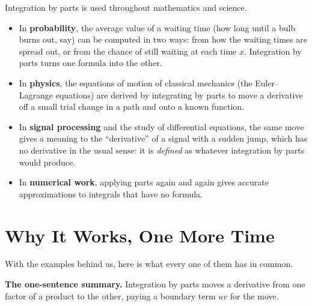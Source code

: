 \begin{applicationbox}
Integration by parts is used throughout mathematics and science.
\begin{itemize}
\item In \textbf{probability}, the average value of a waiting time (how long until
a bulb burns out, say) can be computed in two ways: from how the waiting times are
spread out, or from the chance of still waiting at each time $x$. Integration by
parts turns one formula into the other.
\item In \textbf{physics}, the equations of motion of classical mechanics (the
Euler--Lagrange equations) are derived by integrating by parts to move a
derivative off a small trial change in a path and onto a known function.
\item In \textbf{signal processing} and the study of differential equations, the
same move gives a meaning to the ``derivative'' of a signal with a sudden jump,
which has no derivative in the usual sense: it is \emph{defined} as whatever
integration by parts would produce.
\item In \textbf{numerical work}, applying parts again and again gives accurate
approximations to integrals that have no formula.
\end{itemize}
\end{applicationbox}

\section{Why It Works, One More Time}
\label{ch23:whyworks}

With the examples behind us, here is what every one of them has in common.

\begin{intuitionbox}
\textbf{The one-sentence summary.} Integration by parts moves a derivative from
one factor of a product to the other, paying a boundary term $uv$ for the move.
\end{intuitionbox}


